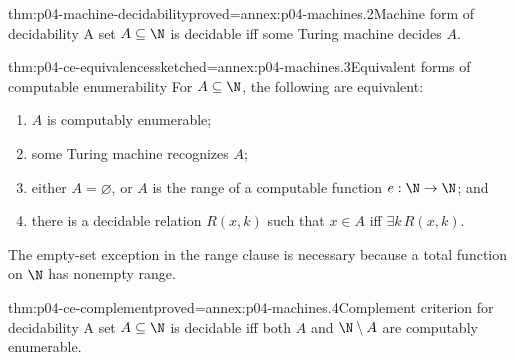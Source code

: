 \begin{hblemma}{thm:p04-machine-decidability}{proved=annex:p04-machines.2}{Machine form of decidability}
A set \(A\subseteq\N\) is decidable iff some Turing machine decides \(A\).
\end{hblemma}

\begin{hbtheorem}{thm:p04-ce-equivalences}{sketched=annex:p04-machines.3}{Equivalent forms of computable enumerability}
For \(A\subseteq\N\), the following are equivalent:
\begin{enumerate}
  \item \(A\) is computably enumerable;
  \item some Turing machine recognizes \(A\);
  \item either \(A=\varnothing\), or \(A\) is the range of a computable
        function \(e:\N\to\N\); and
  \item there is a decidable relation \(R(x,k)\) such that
        \(x\in A\) iff \(\exists k\,R(x,k)\).
\end{enumerate}
The empty-set exception in the range clause is necessary because a total
function on \(\N\) has nonempty range.
\end{hbtheorem}

\begin{hbtheorem}{thm:p04-ce-complement}{proved=annex:p04-machines.4}{Complement criterion for decidability}
A set \(A\subseteq\N\) is decidable iff both \(A\) and
\(\N\setminus A\) are computably enumerable.
\end{hbtheorem}

